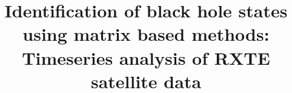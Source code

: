 \documentclass[10pt,conference]{IEEEtran}
\begin{document}
\title{Identification of black hole states using matrix based methods: Timeseries analysis of RXTE satellite data}


\maketitle
\end{document}
